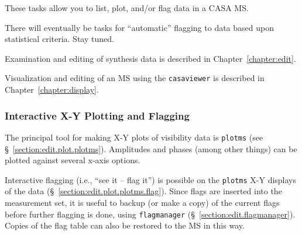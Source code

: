 These tasks allow you to list, plot, and/or flag data in a CASA MS.

There will eventually be tasks for ``automatic'' flagging to
data based upon statistical criteria.  Stay tuned.

Examination and editing of synthesis data is described in
Chapter~\ref{chapter:edit}.

Visualization and editing of an MS using the {\tt casaviewer}
is described in Chapter~\ref{chapter:display}.

\subsubsection{Interactive X-Y Plotting and Flagging}
\label{section:intro.walkthru.flag.plotxy}

The principal tool for making X-Y plots of visibility data is
{\tt plotms} (see \S~\ref{section:edit.plot.plotms}).  Amplitudes and phases
(among other things) can be plotted against several x-axis options.

Interactive flagging (i.e., ``see it -- flag it'') is possible on the
{\tt plotms} X-Y displays of the data
(\S~\ref{section:edit.plot.plotms.flag}).  Since flags are inserted into the
measurement set, it is useful to backup (or make a copy) of the
current flags before further flagging is done, using {\tt flagmanager}
(\S~\ref{section:edit.flagmanager}).  Copies of the flag table can
also be restored to the MS in this way.



